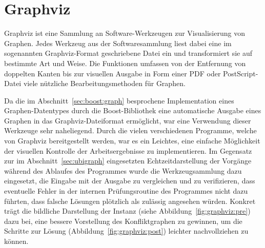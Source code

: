 \section{Graphviz}
Graphviz ist eine Sammlung an Software-Werkzeugen zur Visualisierung von Graphen. Jedes Werkzeug aus der Softwaresammlung liest dabei eine im sogenannten Graphviz-Format ge\-schriebene Datei ein und transformiert
sie auf bestimmte Art und Weise. Die Funktionen umfassen von der Entfernung von doppelten Kanten bis zur visuellen Ausgabe in Form einer PDF oder PostScript-Datei viele nützliche Bearbeitungsmethoden für 
Graphen. 

Da die im Abschnitt~\ref{sec:boost:graph} besprochene Implementation eines Graphen-Datentypes durch die Boost-Bibliothek eine automatische Ausgabe eines Graphen in das Graphviz-Dateiformat er\-möglicht, war 
eine Verwendung dieser Werkzeuge sehr naheliegend. Durch die vielen verschiedenen Programme, welche von Graphviz bereitgestellt werden, war es ein Leichtes, eine einfache Möglichkeit der visuellen Kontrolle
der Arbeitsergebnisse zu implementieren. Im Gegensatz zur im Abschnitt~\ref{sec:ubigraph} eingesetzten Echtzeitdarstellung der Vorgänge während des Ablaufes des Programmes wurde die Werkzeugsammlung dazu eingesetzt,
die Eingabe mit der Ausgabe zu vergleichen und zu verifizieren, dass eventuelle Fehler in der internen Prüfungsroutine des Programmes nicht dazu führten, dass falsche Lösungen plötzlich als zulässig angesehen würden. Konkret trägt die bildliche Darstellung der Instanz (siehe Abbildung~\ref{fig:graphviz:pre}) dazu bei, eine bessere Vorstellung des Konfliktgraphen zu gewinnen, um die Schritte zur Lösung (Abbildung~\ref{fig:graphviz:post}) lei\-ch\-ter nachvollziehen zu können.

